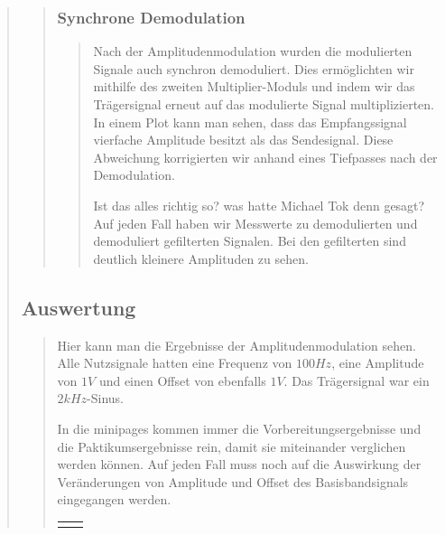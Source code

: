\begin{quote}
\begin{quote}
    	\vspace{1em}
    	
    	\subsubsection{Synchrone Demodulation}
    	\begin{quote}
    	Nach der Amplitudenmodulation wurden die modulierten Signale auch
    	synchron demoduliert. Dies ermöglichten wir mithilfe des zweiten
    	Multiplier-Moduls und indem wir das Trägersignal erneut auf das modulierte
    	Signal multiplizierten. In einem Plot kann man sehen, dass das
    	Empfangssignal vierfache Amplitude besitzt als das Sendesignal.
    	Diese Abweichung korrigierten wir anhand eines Tiefpasses nach der
    	Demodulation.
    	
    	Ist das alles richtig so? was hatte Michael Tok denn gesagt? Auf jeden Fall
    	haben wir Messwerte zu demodulierten und demoduliert gefilterten Signalen.
    	Bei den gefilterten sind deutlich kleinere Amplituden zu sehen.
		\end{quote}    
    
    \end{quote}
    
    \subsection{Auswertung}
    \begin{quote}
        
        Hier kann man die Ergebnisse der Amplitudenmodulation sehen. Alle
        Nutzsignale hatten eine Frequenz von $100 Hz$, eine Amplitude von $1 V$
        und einen Offset von ebenfalls $1 V$. Das Trägersignal war ein $2
        kHz$-Sinus.
        
        In die minipages kommen immer die Vorbereitungsergebnisse und die
        Paktikumsergebnisse rein, damit sie miteinander verglichen werden
        können. Auf jeden Fall muss noch auf die Auswirkung der Veränderungen
        von Amplitude und Offset des Basisbandsignals eingegangen werden.
        
        
        \begin{center}
            \begin{tabular}{ll}

            \hspace{-10em}
                \begin{minipage}{0.6\textwidth}


\end{minipage}
\end{tabular}
\end{center}
\end{quote}
\end{quote}
